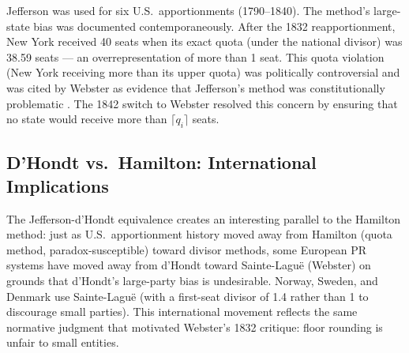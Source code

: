 Jefferson was used for six U.S.\ apportionments (1790--1840).
The method's large-state bias was documented contemporaneously.
After the 1832 reapportionment, New York received 40 seats
when its exact quota (under the national divisor) was 38.59 seats
--- an overrepresentation of more than 1 seat.
This quota violation (New York receiving more than its upper quota)
was politically controversial and was cited by Webster as evidence
that Jefferson's method was constitutionally problematic
\citep{balinski1982fair}.
The 1842 switch to Webster resolved this concern by ensuring that
no state would receive more than $\lceil q_i \rceil$ seats.

\subsection{D'Hondt vs.\ Hamilton: International Implications}

The Jefferson-d'Hondt equivalence creates an interesting parallel
to the Hamilton method:
just as U.S.\ apportionment history moved away from Hamilton
(quota method, paradox-susceptible) toward divisor methods,
some European PR systems have moved away from d'Hondt toward
Sainte-Lagu\"e (Webster) on grounds that d'Hondt's large-party
bias is undesirable.
Norway, Sweden, and Denmark use Sainte-Lagu\"e (with a first-seat
divisor of 1.4 rather than 1 to discourage small parties).
This international movement reflects the same normative judgment
that motivated Webster's 1832 critique: floor rounding is unfair
to small entities.
